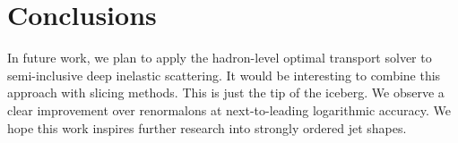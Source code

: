 \section{Conclusions}\label{sec:conclusions}

In future work, we plan to apply the hadron-level optimal transport
solver to semi-inclusive deep inelastic scattering. It would be
interesting to combine this approach with slicing methods. This is just
the tip of the iceberg. We observe a clear improvement over renormalons
at next-to-leading logarithmic accuracy. We hope this work inspires
further research into strongly ordered jet shapes.

